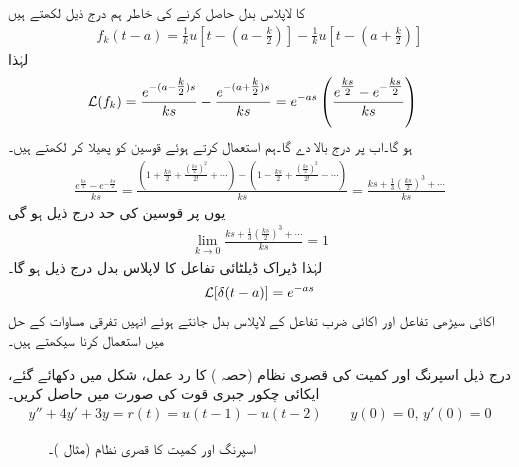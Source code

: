  کا لاپلاس بدل حاصل کرنے کی خاطر ہم درج ذیل لکھتے ہیں
\begin{align*}
f_k(t-a)=\frac{1}{k}u[t-(a-\tfrac{k}{2})]-\frac{1}{k}u[t-(a+\tfrac{k}{2})]
\end{align*}
لہٰذا
\begin{align*}
\mathcal{L}(f_k)&=\frac{e^{-(a-\tfrac{k}{2})s}}{ks}-\frac{e^{-(a+\tfrac{k}{2})s}}{ks}=e^{-as}\left(\frac{e^{\tfrac{ks}{2}}-e^{-\tfrac{ks}{2}}}{ks}\right)
\end{align*}
ہو گا۔اب  پر درج بالا  دے گا۔ہم  استعمال کرتے ہوئے  قوسین کو پھیلا کر لکھتے ہیں۔
\begin{align*}
\frac{e^{\tfrac{ks}{2}}-e^{-\tfrac{ks}{2}}}{ks}=\frac{(1+\tfrac{ks}{2}+\tfrac{(\tfrac{ks}{2})^2}{2!}+\cdots)-(1-\tfrac{ks}{2}+\tfrac{(\tfrac{ks}{2})^2}{2!}-\cdots)}{ks}=\frac{ks+\tfrac{1}{3}(\tfrac{ks}{2})^3+\cdots}{ks}
\end{align*}
یوں  پر قوسین کی حد درج ذیل ہو گی
\begin{align*}
\lim_{k \to 0} \frac{ks+\tfrac{1}{3}(\tfrac{ks}{2})^3+\cdots}{ks}=1
\end{align*}
لہٰذا ڈیراک ڈیلٹائی تفاعل کا لاپلاس بدل درج ذیل ہو گا۔
\begin{align}\label{مساوات_لاپلاس_اکائی_ضرب_کا_بدل}
\mathcal{L}[\delta(t-a)]=e^{-as}
\end{align}
اکائی سیڑھی تفاعل اور اکائی ضرب تفاعل کے لاپلاس بدل جانتے ہوئے انہیں تفرقی مساوات کے حل میں استعمال کرنا سیکھتے ہیں۔

درج ذیل اسپرنگ اور کمیت کی قصری نظام (حصہ ) کا رد عمل، شکل  میں دکھائے گئے، ایکائی چکور جبری قوت کی صورت میں حاصل کریں۔  
\begin{align}
y''+4y'+3y=r(t)=u(t-1)-u(t-2)\quad \quad y(0)=0,\, y'(0)=0
\end{align}
%
\begin{figure}
\centering
{}
\caption{اسپرنگ اور کمیت کا قصری نظام (مثال )۔}
\label{شکل_مثال_لاپلاس_قصری_اسپرنگ_کمیت_الف}
\end{figure}

